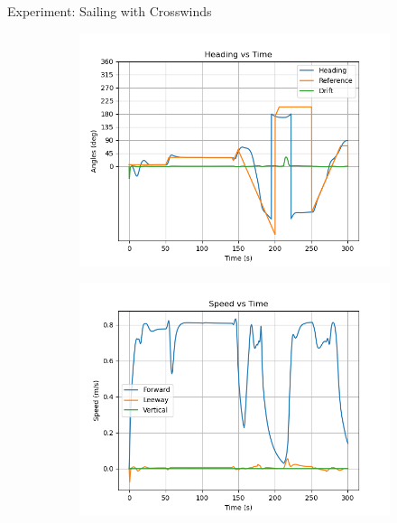 \documentclass[10pt,xcolor={table,dvipsnames},t]{beamer}
\begin{document}
\begin{frame}{Experiment: Sailing with Crosswinds}
    \begin{figure}
     \centering
     \begin{subfigure}[b]{0.35\textwidth}
         \centering
         \includegraphics[width=\textwidth,trim={0.5cm 0.25cm 1.25cm 0.75cm },clip]{documents/final_pres_figs/right_to_wind_to_40_40_heading.png}
         \label{fig:right_wind_heading}
     \end{subfigure}
     \begin{subfigure}[b]{0.35\textwidth}
         \centering
         \includegraphics[width=\textwidth,trim={0.5cm 0.25cm 1.25cm 0.75cm },clip]{documents/final_pres_figs/right_to_wind_to_40_40_speed.png}

\end{subfigure}
\end{figure}
\end{frame}
\end{document}
